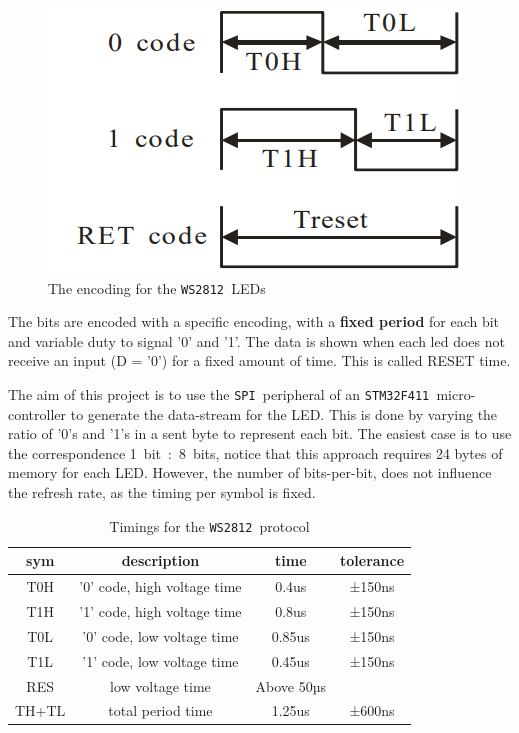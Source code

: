 \documentclass[10pt,a4]{article}
\newcommand{\stm}{\texttt{STM32F411 }}
\newcommand{\ws}{\texttt{WS2812 }}
\newcommand{\spi}{\texttt{SPI }}
\begin{document}
\begin{figure}
\centering
\includegraphics[width=\linewidth]{encoding.png}
\caption{\label{fig:encoding}The encoding for the \ws LEDs}
\end{figure}

The bits are encoded with a specific encoding, with a \textbf{fixed period} for each bit and variable duty to signal '0' and '1'.
The data is shown when each led does not receive an input (D = '0') for a fixed amount of time. This is called RESET time.

The aim of this project is to use the \spi peripheral of an \stm micro-controller to generate the data-stream for the LED. This is done by varying the ratio of '0's and '1's in a sent byte  to represent each bit.
The easiest case is to use the correspondence 1~bit~:~8~bits, notice that this approach requires 24 bytes of memory for each LED. However, the number of bits-per-bit, does not influence the refresh rate, as the timing per symbol is fixed. 

\begin{table}
\begin{tabular}{|c|c|c|c|}
\hline
sym & description & time & tolerance \\
\hline
T0H & '0'  code, high voltage time & 0.4us &±150ns \\
T1H & '1'  code, high voltage time & 0.8us &±150ns \\
T0L & '0'  code, low voltage time  & 0.85us& ±150ns \\
T1L & '1'  code, low voltage time  & 0.45us &±150ns\\
RES & low voltage time & Above 50µs& \\
TH+TL & total period time & 1.25us & ±600ns \\
\hline
\end{tabular}
\caption{\label{tab:timings}Timings for the \ws protocol}
\end{table}
\FloatBarrier %
\end{document}
